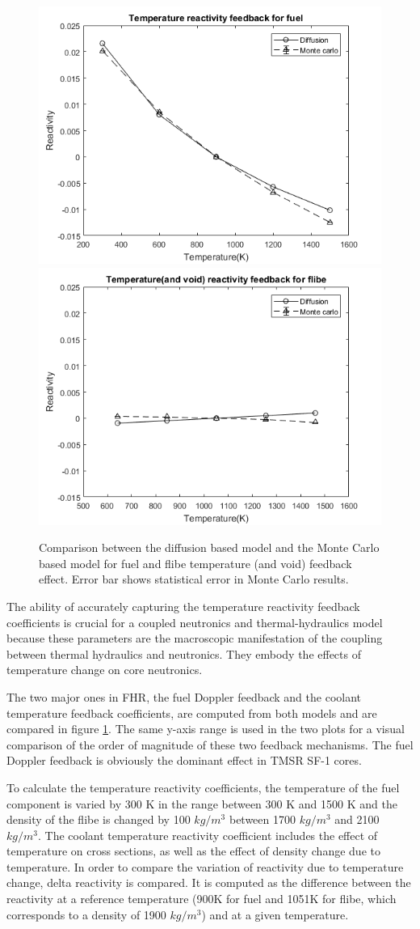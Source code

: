 \documentclass{elsarticle}
\begin{document}
\begin{figure}
  \centering
  \includegraphics[width=0.6\columnwidth]{./images/benchmark/feedback_fuel.png}
  \includegraphics[width=0.6\columnwidth]{./images/benchmark/feedback_flibe.png}
  \caption{Comparison between the diffusion based model and the Monte Carlo based model for fuel and flibe temperature (and void) feedback effect. Error bar shows statistical error in Monte Carlo results.} 
  \label{fig:fuel_feedback}
\end{figure}



The ability of accurately capturing the temperature reactivity feedback coefficients is crucial for a coupled neutronics and thermal-hydraulics model because these parameters are the macroscopic manifestation of the coupling between thermal hydraulics and neutronics. They embody the effects of temperature change on core neutronics. 

The two major ones in FHR, the fuel Doppler feedback and the coolant temperature feedback coefficients, are computed from both models and are compared in figure \ref{fig:fuel_feedback}. The same y-axis range is used in the two plots for a visual comparison of the order of magnitude of these two feedback mechanisms. The fuel Doppler feedback is obviously the dominant effect in TMSR SF-1 cores.

To calculate the temperature reactivity coefficients, the temperature of the fuel component is varied by 300 K in the range between 300 K and 1500 K and the density of the flibe is changed by 100 $kg/m^3$ between 1700 $kg/m^3$ and 2100 $kg/m^3$. The coolant temperature reactivity coefficient includes the effect of temperature on cross sections, as well as the effect of density change due to temperature. 
In order to compare the variation of reactivity due to temperature change, delta reactivity is compared. It is computed as the difference between the reactivity at a reference temperature (900K for fuel and 1051K for flibe, which corresponds to a density of 1900 $kg/m^3$) and at a given temperature. 
\end{document}
